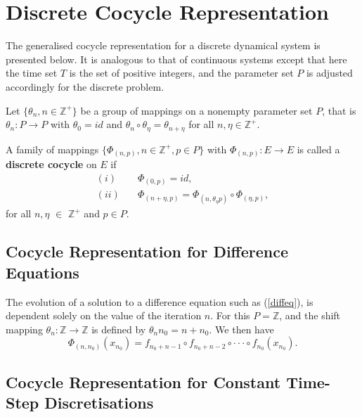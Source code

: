 \section{Discrete Cocycle Representation}

The generalised cocycle representation for a discrete dynamical
system is presented below. It is analogous to that of continuous
systems except that here the time set $T$ is the set of positive
integers, and the parameter set $P$ is adjusted accordingly for
the discrete problem.

\begin{defn} \label{dcrep}
Let $\{ \theta_n, n \in \mathbb{Z}^+ \}$ be a group of mappings on a
nonempty parameter set $P$, that is $\theta_n : P \rightarrow P$ with
$\theta_0 = id$ and $\theta_{n} \circ \theta_{\eta} =
\theta_{n+\eta}$ for all $n, \eta \in \mathbb{Z}^+$.

A family of mappings $\{ \Phi_{(n,p)}, n \in \mathbb{Z}^+, p \in
P \}$ with $\Phi_{(n, p)}: E \to E$ is called a {\bf discrete
cocycle} on $E$ if
\begin{align*}
  (i) \quad & \Phi_{(0, p)} = id, \\
  (ii) \quad & \Phi_{(n +\eta, p)} = \Phi_{(n, \theta_{\eta}p)} \circ
         \Phi_{(\eta, p)},
\end{align*}
for all  $n, \eta$ $\in$ $\mathbb{Z}^+$ and $p \in P$.
\end{defn}

\subsection{Cocycle Representation for Difference Equations}

The evolution of a solution to a difference equation such as
(\ref{diffeq}), is dependent solely on the value of the iteration
$n$. For this $P = \mathbb{Z}$, and the shift mapping $\theta_n
: \mathbb{Z} \rightarrow \mathbb{Z}$ is defined by $\theta_n n_0 = n + n_0$.
We then have
\[ \Phi_{(n, n_0)}(x_{n_0}) = f_{n_0+n-1} \circ f_{n_0+n-2} \circ \cdot \cdot \cdot
                        \circ f_{n_0}(x_{n_0}). \]

\subsection{Cocycle Representation for Constant Time-Step Discretisations}

